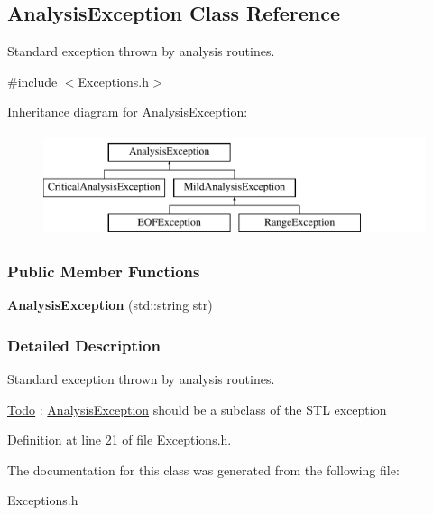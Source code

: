 \hypertarget{classAnalysisException}{
\subsection{AnalysisException Class Reference}
\label{classAnalysisException}
}


Standard exception thrown by analysis routines.  




{\ttfamily \#include $<$Exceptions.h$>$}

Inheritance diagram for AnalysisException:\begin{figure}[H]
\begin{center}
\leavevmode
\includegraphics[height=3.000000cm]{classAnalysisException}
\end{center}
\end{figure}
\subsubsection*{Public Member Functions}
\begin{DoxyCompactItemize}
\item 
\hypertarget{classAnalysisException_a0ff1612d70c588e03de0b24744691a9f}{
{\bfseries AnalysisException} (std::string str)}
\label{classAnalysisException_a0ff1612d70c588e03de0b24744691a9f}

\end{DoxyCompactItemize}


\subsubsection{Detailed Description}
Standard exception thrown by analysis routines. 

\begin{Desc}
\item[\hyperlink{todo__todo000011}{Todo}]: \hyperlink{classAnalysisException}{AnalysisException} should be a subclass of the STL exception \end{Desc}


Definition at line 21 of file Exceptions.h.



The documentation for this class was generated from the following file:\begin{DoxyCompactItemize}
\item 
Exceptions.h\end{DoxyCompactItemize}
